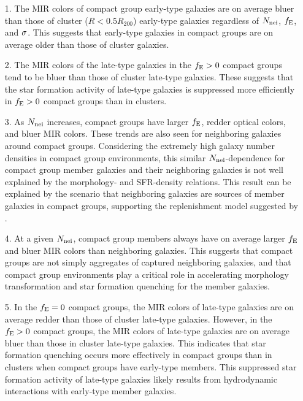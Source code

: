 \documentclass[12pt,preprint,apj]{emulateapj}
\newcommand{\efrac}{f_{\rm E}}
\newcommand{\nbg}{N_{\rm nei}}
\begin{document}
\begin{itemize}

\item[1.] The MIR colors of compact group early-type galaxies are on average
bluer than those of cluster ($R<0.5R_{200}$) early-type galaxies 
regardless of $\nbg$, $\efrac$, and $\sigma_{\rm}$.
This suggests that early-type galaxies in compact groups are on average older 
than those of cluster galaxies. 

\item[2.]  The MIR colors of the late-type galaxies in the $\efrac>0$ compact groups
tend to be bluer than those of cluster late-type galaxies.
These suggests that
the star formation activity of late-type galaxies is suppressed more efficiently 
in $\efrac>0$ compact groups than in clusters. 

\item[3.] As $\nbg$ increases, compact groups have larger $\efrac$, redder 
optical colors, and bluer MIR colors. These trends are also seen for 
neighboring galaxies around compact groups. 
Considering the extremely high galaxy number densities in compact group 
environments, this similar $\nbg$-dependence for compact group member galaxies 
and their neighboring galaxies is not well explained by the morphology- and 
SFR-density relations. This result can be explained by the scenario that 
neighboring galaxies are sources of member galaxies in compact groups, 
supporting the replenishment model suggested by \citet{diaferio+94}.

\item[4.] At a given $\nbg$, compact group members always have on average 
larger $\efrac$ and bluer MIR colors than neighboring galaxies.
This suggests that compact groups are not simply aggregates of captured 
neighboring galaxies, and that compact group environments play 
a critical role in accelerating morphology transformation and 
star formation quenching for the member galaxies.

\item[5.] In the $\efrac=0$ compact groups, the MIR colors of late-type galaxies 
are on average redder than those of cluster late-type galaxies. 
However, in the $\efrac>0$ compact groups, the MIR colors of late-type galaxies 
are on average bluer than those in cluster late-type galaxies.
This indicates that star formation quenching occurs more effectively 
in compact groups than in clusters when compact groups have early-type members. 
This suppressed star formation activity of late-type galaxies likely results from 
hydrodynamic interactions with early-type member galaxies.

\end{itemize}
\end{document}
